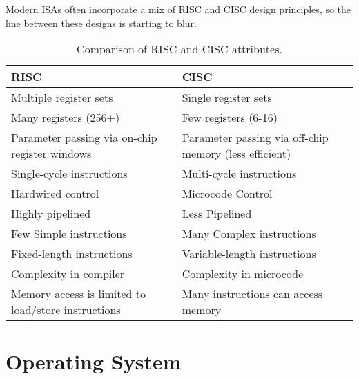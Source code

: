 \documentclass[pdftex,10pt]{article}
\begin{document}
Modern ISAs often incorporate a mix of RISC and CISC design principles, so the line between these designs is starting to blur.

\begin{table}[h]
    \abovedisplayskip=-5pt
    \belowdisplayskip=-5pt
    \centering
    \begin{tabularx}{\textwidth}{| X | X |}
        \hline
        \textbf{RISC}                                       & \textbf{CISC}                                          \\ \hline
        Multiple register sets                              & Single register sets                                   \\ \hline
        Many registers (256+)                               & Few registers (6-16)                                   \\ \hline
        Parameter passing via on-chip register windows      & Parameter passing via off-chip memory (less efficient) \\ \hline
        Single-cycle instructions                           & Multi-cycle instructions                               \\ \hline
        Hardwired control                                   & Microcode Control                                      \\ \hline
        Highly pipelined                                    & Less Pipelined                                         \\ \hline
        Few Simple instructions                             & Many Complex instructions                              \\ \hline
        Fixed-length instructions                           & Variable-length instructions                           \\ \hline
        Complexity in compiler                              & Complexity in microcode                                \\ \hline
        Memory access is limited to load/store instructions & Many instructions can access memory                    \\ \hline
    \end{tabularx}
    \caption{Comparison of RISC and CISC attributes.}
\end{table}

\section{Operating System}
\end{document}
